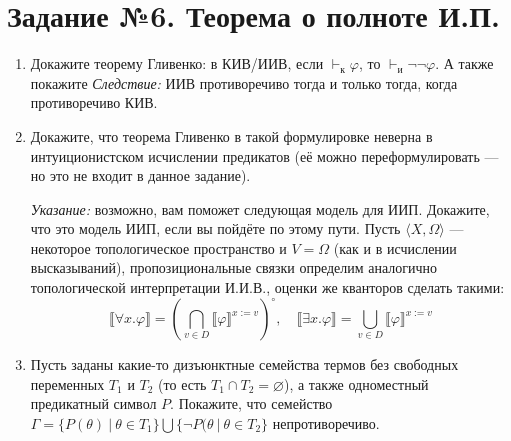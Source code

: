 \documentclass[10pt,a4paper,oneside]{article}
\begin{document}
\section*{Задание №6. Теорема о полноте И.П.}
\begin{enumerate}
\item Докажите теорему Гливенко: в КИВ/ИИВ, если $\vdash_\text{к} \varphi$, то $\vdash_\text{и} \neg\neg\varphi$. А также покажите
\emph{Следствие:} ИИВ противоречиво тогда и только тогда, когда противоречиво КИВ.
\item Докажите, что теорема Гливенко в такой формулировке неверна в интуиционистском исчислении предикатов
(её можно переформулировать --- но это не входит в данное задание).

\emph{Указание:} возможно, вам поможет следующая модель для ИИП. Докажите, что это модель ИИП, если вы пойдёте по этому пути.
Пусть $\langle X, \Omega\rangle$ --- некоторое топологическое
пространство и $V = \Omega$ (как и в исчислении высказываний),
пропозициональные связки определим аналогично топологической интерпретации И.И.В., 
оценки же кванторов сделать такими:
$$\llbracket \forall x.\varphi \rrbracket = \left(\bigcap_{v \in D} \llbracket \varphi \rrbracket^{x := v}\right)^\circ,\quad
  \llbracket \exists x.\varphi \rrbracket = \bigcup_{v \in D} \llbracket \varphi \rrbracket^{x := v}$$

\item Пусть заданы какие-то дизъюнктные семейства термов без свободных переменных $T_1$ и $T_2$ (то есть
$T_1 \cap T_2 = \varnothing$), а также одноместный предикатный символ $P$.
Покажите, что семейство $\Gamma = \{ P(\theta)\ |\ \theta \in T_1 \} \bigcup \{ \neg P(\theta\ |\ \theta \in T_2 \}$ 
непротиворечиво.



\end{enumerate}
\end{document}

